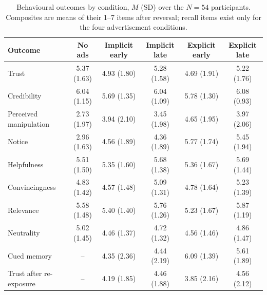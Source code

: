 \begin{table}[!htb]
\centering
\footnotesize
\caption{Behavioural outcomes by condition, \(M\) (SD) over the \(N=54\) participants. Composites are means of their 1--7 items after reversal; recall items exist only for the four advertisement conditions.}
\label{tab:beh-descriptives}
\setlength{\tabcolsep}{3.5pt}
\begin{tabular}{@{}l ccccc@{}}
\toprule
Outcome & No ads & Implicit early & Implicit late & Explicit early & Explicit late \\
\midrule
Trust & 5.37 (1.63) & 4.93 (1.80) & 5.28 (1.58) & 4.69 (1.91) & 5.22 (1.76) \\
Credibility & 6.04 (1.15) & 5.69 (1.35) & 6.04 (1.09) & 5.78 (1.30) & 6.08 (0.93) \\
Perceived manipulation & 2.73 (1.97) & 3.94 (2.10) & 3.45 (1.98) & 4.65 (1.95) & 3.97 (2.06) \\
Notice & 2.96 (1.63) & 4.56 (1.89) & 4.36 (1.89) & 5.77 (1.74) & 5.45 (1.94) \\
\midrule
Helpfulness & 5.51 (1.50) & 5.35 (1.60) & 5.68 (1.38) & 5.36 (1.67) & 5.69 (1.44) \\
Convincingness & 4.83 (1.42) & 4.57 (1.48) & 5.09 (1.31) & 4.78 (1.64) & 5.23 (1.39) \\
Relevance & 5.58 (1.48) & 5.40 (1.40) & 5.76 (1.26) & 5.23 (1.67) & 5.87 (1.19) \\
Neutrality & 5.02 (1.45) & 4.46 (1.37) & 4.72 (1.32) & 4.56 (1.46) & 4.86 (1.47) \\
\midrule
Cued memory & -- & 4.35 (2.36) & 4.44 (2.19) & 6.09 (1.39) & 5.61 (1.89) \\
Trust after re-exposure & -- & 4.19 (1.85) & 4.46 (1.88) & 3.85 (2.16) & 4.56 (2.12) \\
\bottomrule
\end{tabular}
\end{table}
